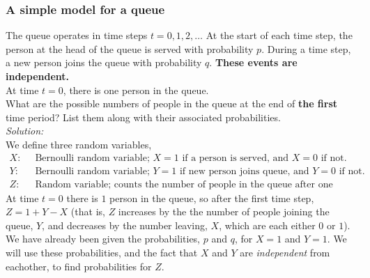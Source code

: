 \subsubsection{A simple model for a queue}
The queue operates in time steps $t = 0,1,2,\ldots$ At the start of each time step, the person at the head of the queue is served with probability $p$. During a time step, a new person joins the queue with probability $q$. \textbf{These events are independent.} \\

\noindent At time $t = 0$, there is one person in the queue. \\

\noindent What are the possible numbers of people in the queue at the end of \textbf{the first} time period? List them along with their associated probabilities. \\

\noindent\textit{Solution:} \\
We define three random variables,
\begin{align*}
X: \;\;& \text{Bernoulli random variable; $X = 1$ if a person is served, and $X = 0$ if not.} \\
Y: \;\;& \text{Bernoulli random variable; $Y = 1$ if new person joins queue, and $Y = 0$ if not.} \\
Z: \;\;& \text{Random variable; counts the number of people in the queue after one time step.} 
\end{align*}
At time $t = 0$ there is $1$ person in the queue, so after the first time step, $Z = 1 + Y - X$ (that is, $Z$ increases by the the number of people joining the queue, $Y$, and decreases by the number leaving, $X$, which are each either $0$ or $1$). \\

\noindent We have already been given the probabilities, $p$ and $q$, for $X = 1$ and $Y = 1$. We will use these probabilities, and the fact that $X$ and $Y$ are \textit{independent} from eachother, to find probabilities for $Z$. \\

